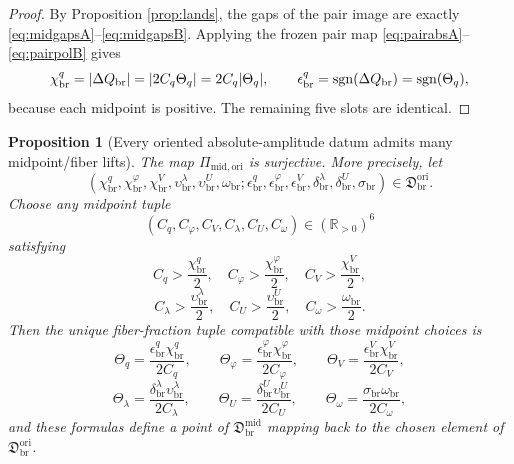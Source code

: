 \documentclass[11pt]{article}
\newcommand{\OriginSector}{\mathfrak D_{\mathrm{br}}^{\mathrm{ori}}}
\newcommand{\AbsReadAmp}{\chi_{\mathrm{br}}^{q}}
\newcommand{\AbsCovAmp}{\chi_{\mathrm{br}}^{\varphi}}
\newcommand{\AbsRelaxAmp}{\chi_{\mathrm{br}}^{V}}
\newcommand{\AbsWellAmp}{\upsilon_{\mathrm{br}}^{\lambda}}
\newcommand{\AbsEqAmp}{\upsilon_{\mathrm{br}}^{U}}
\newcommand{\AbsScaleAmp}{\omega_{\mathrm{br}}}
\newcommand{\PolRead}{\epsilon_{\mathrm{br}}^{q}}
\newcommand{\PolCov}{\epsilon_{\mathrm{br}}^{\varphi}}
\newcommand{\PolRelax}{\epsilon_{\mathrm{br}}^{V}}
\newcommand{\PolWell}{\delta_{\mathrm{br}}^{\lambda}}
\newcommand{\PolEq}{\delta_{\mathrm{br}}^{U}}
\newcommand{\PolScale}{\sigma_{\mathrm{br}}}
\newcommand{\GapRead}{\Delta Q_{\mathrm{br}}}
\newcommand{\MidFiberSector}{\mathfrak D_{\mathrm{br}}^{\mathrm{mid}}}
\newcommand{\MidOriginMap}{\Pi_{\mathrm{mid,ori}}}
\newcommand{\MidRead}{C_{q}}
\newcommand{\MidCov}{C_{\varphi}}
\newcommand{\MidRelax}{C_{V}}
\newcommand{\MidWell}{C_{\lambda}}
\newcommand{\MidEq}{C_{U}}
\newcommand{\MidScale}{C_{\omega}}
\newcommand{\FiberRead}{\Theta_{q}}
\newcommand{\FiberCov}{\Theta_{\varphi}}
\newcommand{\FiberRelax}{\Theta_{V}}
\newcommand{\FiberWell}{\Theta_{\lambda}}
\newcommand{\FiberEq}{\Theta_{U}}
\newcommand{\FiberScale}{\Theta_{\omega}}
\newtheorem{proposition}{Proposition}
\begin{document}
\begin{proof}
By Proposition \ref{prop:lands}, the gaps of the pair image are exactly \eqref{eq:midgapsA}--\eqref{eq:midgapsB}. Applying the frozen pair map \eqref{eq:pairabsA}--\eqref{eq:pairpolB} gives
\[
\AbsReadAmp=\abs{\GapRead}=\abs{2\MidRead\FiberRead}=2\MidRead\abs{\FiberRead},
\qquad
\PolRead=\operatorname{sgn}(\GapRead)=\operatorname{sgn}(\FiberRead),
\]
because each midpoint is positive. The remaining five slots are identical.
\end{proof}

\begin{proposition}[Every oriented absolute-amplitude datum admits many midpoint/fiber lifts]
\label{prop:surjective}
The map \(\MidOriginMap\) is surjective. More precisely, let
\[
(\AbsReadAmp,\AbsCovAmp,\AbsRelaxAmp,\AbsWellAmp,\AbsEqAmp,\AbsScaleAmp;
\PolRead,\PolCov,\PolRelax,\PolWell,\PolEq,\PolScale)\in\OriginSector.
\]
Choose any midpoint tuple
\[
(\MidRead,\MidCov,\MidRelax,\MidWell,\MidEq,\MidScale)\in(\mathbb R_{>0})^{6}
\]
satisfying
\begin{equation}
\MidRead>\frac{\AbsReadAmp}{2},
\quad
\MidCov>\frac{\AbsCovAmp}{2},
\quad
\MidRelax>\frac{\AbsRelaxAmp}{2},
\label{eq:midineqA}
\end{equation}
\begin{equation}
\MidWell>\frac{\AbsWellAmp}{2},
\quad
\MidEq>\frac{\AbsEqAmp}{2},
\quad
\MidScale>\frac{\AbsScaleAmp}{2}.
\label{eq:midineqB}
\end{equation}
Then the unique fiber-fraction tuple compatible with those midpoint choices is
\begin{equation}
\FiberRead=\frac{\PolRead\AbsReadAmp}{2\MidRead},
\qquad
\FiberCov=\frac{\PolCov\AbsCovAmp}{2\MidCov},
\qquad
\FiberRelax=\frac{\PolRelax\AbsRelaxAmp}{2\MidRelax},
\label{eq:forcedfiberA}
\end{equation}
\begin{equation}
\FiberWell=\frac{\PolWell\AbsWellAmp}{2\MidWell},
\qquad
\FiberEq=\frac{\PolEq\AbsEqAmp}{2\MidEq},
\qquad
\FiberScale=\frac{\PolScale\AbsScaleAmp}{2\MidScale},
\label{eq:forcedfiberB}
\end{equation}
and these formulas define a point of \(\MidFiberSector\) mapping back to the chosen element of \(\OriginSector\).
\end{proposition}
\end{document}
